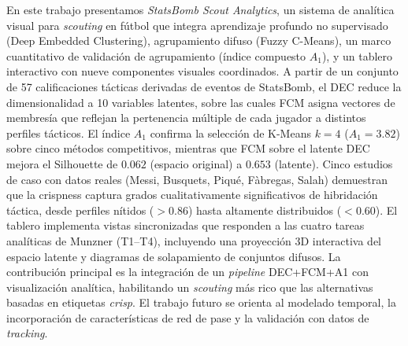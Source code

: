 \documentclass[conference]{IEEEtran}
\begin{document}
En este trabajo presentamos \textit{StatsBomb Scout Analytics}, un sistema de analítica visual para \textit{scouting} en fútbol que integra aprendizaje profundo no supervisado (Deep Embedded Clustering), agrupamiento difuso (Fuzzy C-Means), un marco cuantitativo de validación de agrupamiento (índice compuesto $A_1$), y un tablero interactivo con nueve componentes visuales coordinados. A partir de un conjunto de 57 calificaciones tácticas derivadas de eventos de StatsBomb, el DEC reduce la dimensionalidad a 10 variables latentes, sobre las cuales FCM asigna vectores de membresía que reflejan la pertenencia múltiple de cada jugador a distintos perfiles tácticos. El índice $A_1$ confirma la selección de K-Means $k=4$ ($A_1=3.82$) sobre cinco métodos competitivos, mientras que FCM sobre el latente DEC mejora el Silhouette de $0.062$ (espacio original) a $0.653$ (latente). Cinco estudios de caso con datos reales (Messi, Busquets, Piqué, Fàbregas, Salah) demuestran que la crispness captura grados cualitativamente significativos de hibridación táctica, desde perfiles nítidos ($>0.86$) hasta altamente distribuidos ($<0.60$). El tablero implementa vistas sincronizadas que responden a las cuatro tareas analíticas de Munzner (T1--T4), incluyendo una proyección 3D interactiva del espacio latente y diagramas de solapamiento de conjuntos difusos. La contribución principal es la integración de un \textit{pipeline} DEC+FCM+A1 con visualización analítica, habilitando un \textit{scouting} más rico que las alternativas basadas en etiquetas \textit{crisp}. El trabajo futuro se orienta al modelado temporal, la incorporación de características de red de pase y la validación con datos de \textit{tracking}.



\end{document}
